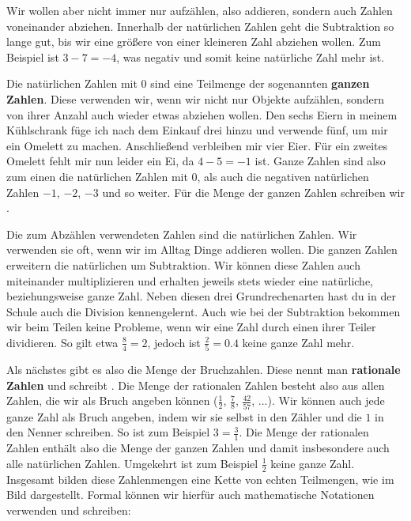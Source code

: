 \documentclass[../../main.tex]{subfiles}
\begin{document}
	Wir wollen aber nicht immer nur aufzählen, also addieren, sondern auch Zahlen voneinander abziehen. Innerhalb der natürlichen Zahlen geht die Subtraktion so lange gut, bis wir eine größere von einer kleineren Zahl abziehen wollen. Zum Beispiel ist $3-7=-4$, was negativ und somit keine natürliche Zahl mehr ist. 
	
	Die natürlichen Zahlen mit $0$ sind eine Teilmenge der sogenannten \textbf{ganzen Zahlen}. Diese verwenden wir, wenn wir nicht nur Objekte aufzählen, sondern von ihrer Anzahl auch wieder etwas abziehen wollen. Den sechs Eiern in meinem Kühlschrank füge ich nach dem Einkauf drei hinzu und verwende fünf, um mir ein Omelett zu machen. Anschließend verbleiben mir vier Eier. Für ein zweites Omelett fehlt mir nun leider ein Ei, da $4-5=-1$ ist. Ganze Zahlen sind also zum einen die natürlichen Zahlen mit $0$, als auch die negativen natürlichen Zahlen $-1$, $-2$, $-3$ und so weiter. Für die Menge der ganzen Zahlen schreiben wir \Integer.
	
	Die zum Abzählen verwendeten Zahlen sind die natürlichen Zahlen. Wir verwenden sie oft, wenn wir im Alltag Dinge addieren wollen. Die ganzen Zahlen erweitern die natürlichen um Subtraktion. Wir können diese Zahlen auch miteinander multiplizieren und erhalten jeweils stets wieder eine natürliche, beziehungsweise ganze Zahl. Neben diesen drei Grundrechenarten hast du in der Schule auch die Division kennengelernt. Auch wie bei der Subtraktion bekommen wir beim Teilen keine Probleme, wenn wir eine Zahl durch einen ihrer Teiler dividieren. So gilt etwa $\frac{8}{4} = 2$, jedoch ist $\frac{2}{5} = 0.4$ keine ganze Zahl mehr.

	Als nächstes gibt es also die Menge der Bruchzahlen. Diese nennt man \textbf{rationale Zahlen} und schreibt \Rational. Die Menge der rationalen Zahlen besteht also aus allen Zahlen, die wir als Bruch angeben können ($\frac{1}{2}$, $\frac{7}{8}$, $\frac{42}{57}$, $\ldots$). Wir können auch jede ganze Zahl als Bruch angeben, indem wir sie selbst in den Zähler und die $1$ in den Nenner schreiben. So ist zum Beispiel $3 = \frac{3}{1}$. Die Menge der rationalen Zahlen enthält also die Menge der ganzen Zahlen und damit insbesondere auch alle natürlichen Zahlen. Umgekehrt ist zum Beispiel $\frac{1}{2}$ keine ganze Zahl. Insgesamt bilden diese Zahlenmengen eine Kette von echten Teilmengen, wie im Bild dargestellt. Formal können wir hierfür auch mathematische Notationen verwenden und schreiben:
	
\end{document}
